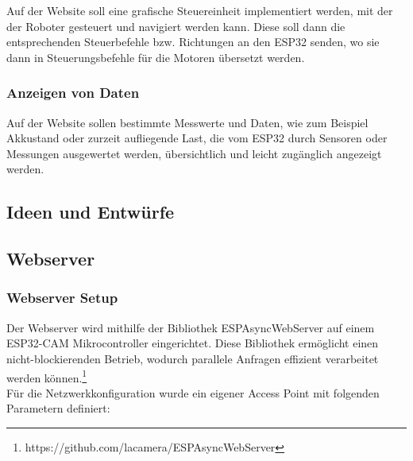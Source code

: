 \documentclass[ngerman,12pt,a4paper]{article}
\begin{document}
	Auf der Website soll eine grafische Steuereinheit implementiert werden, mit der der Roboter gesteuert und navigiert werden kann. Diese soll dann die entsprechenden Steuerbefehle bzw. Richtungen an den ESP32 senden, wo sie dann in Steuerungsbefehle für die Motoren übersetzt werden.  
	
			\subsubsection*{Anzeigen von Daten}
	
	Auf der Website sollen bestimmte Messwerte und Daten, wie zum Beispiel Akkustand oder zurzeit aufliegende Last, die vom ESP32 durch Sensoren oder Messungen ausgewertet werden, übersichtlich und leicht zugänglich angezeigt werden.
	
		\subsection{Ideen und Entwürfe}
		
		\subsection{Webserver}
		
			\subsubsection{Webserver Setup}
			
	Der Webserver wird mithilfe der Bibliothek ESPAsyncWebServer auf einem ESP32-CAM Mikrocontroller eingerichtet. Diese Bibliothek ermöglicht einen nicht-blockierenden Betrieb, wodurch parallele Anfragen effizient verarbeitet werden können.\footnote{https://github.com/lacamera/ESPAsyncWebServer} \\[0.5cm]
	Für die Netzwerkkonfiguration wurde ein eigener Access Point mit folgenden Parametern definiert:
	
\end{document}
